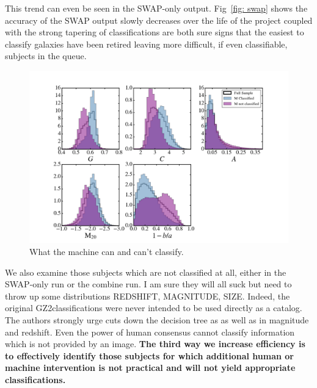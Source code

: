 \documentclass[twocolumn]{aastex6}
\begin{document}
This trend can even be seen in the SWAP-only output. 
Fig~\ref{fig: swap} shows the accuracy of the SWAP output slowly decreases 
over the life of the project coupled with the strong tapering of classifications 
are both sure signs that the easiest to classify galaxies have been retired leaving
more difficult, if even classifiable, subjects in the queue. 

\begin{figure}[t!]
\includegraphics[width=7in]{figures/machine_compare_clssfd_not_morph_params1D.png}
\caption{What the machine can and can't classify. \label{fig: machine classified}}
\end{figure}

We also examine those subjects which are not classified at all, either in the SWAP-only
run or the combine run. I am sure they will all suck but need to throw up some distributions
REDSHIFT, MAGNITUDE, SIZE.  Indeed, the original GZ2classifications were never intended 
to be used directly as a catalog. The authors strongly urge cuts down the decision tree as
as well as in magnitude and redshift. Even the power of human consensus  cannot 
classify information which is not provided by an image. \textbf{The third way we increase 
efficiency is to effectively identify those subjects for which additional human or 
machine intervention is not practical and will not yield appropriate classifications.} 




\end{document}
